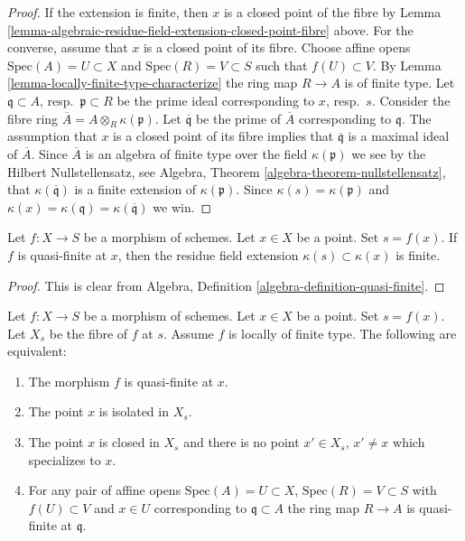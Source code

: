 \begin{proof}
If the extension is finite, then $x$ is a closed point of
the fibre by
Lemma \ref{lemma-algebraic-residue-field-extension-closed-point-fibre}
above. For the converse, assume that $x$ is a closed point
of its fibre. Choose affine opens $\text{Spec}(A) = U \subset X$
and $\text{Spec}(R) = V \subset S$ such that $f(U) \subset V$.
By Lemma \ref{lemma-locally-finite-type-characterize} the ring map
$R \to A$ is of finite type. Let $\mathfrak q \subset A$,
resp.\ $\mathfrak p \subset R$ be the prime ideal corresponding
to $x$, resp.\ $s$. Consider the fibre ring
$\overline{A} = A \otimes_R \kappa(\mathfrak p)$.
Let $\overline{\mathfrak q}$ be the prime of $\overline{A}$
corresponding to $\mathfrak q$. The assumption that $x$
is a closed point of its fibre implies that $\overline{\mathfrak q}$
is a maximal ideal of $\overline{A}$. Since $\overline{A}$
is an algebra of finite type over the field $\kappa(\mathfrak p)$
we see by the Hilbert Nullstellensatz, see
Algebra, Theorem \ref{algebra-theorem-nullstellensatz},
that $\kappa(\overline{\mathfrak q})$ is a finite extension
of $\kappa(\mathfrak p)$.
Since $\kappa(s) = \kappa(\mathfrak p)$ and
$\kappa(x) = \kappa(\mathfrak q) = \kappa(\overline{\mathfrak q})$
we win.
\end{proof}

\begin{lemma}
\label{lemma-residue-field-quasi-finite}
Let $f : X \to S$ be a morphism of schemes.
Let $x \in X$ be a point. Set $s = f(x)$.
If $f$ is quasi-finite at $x$, then the residue field
extension $\kappa(s) \subset \kappa(x)$ is finite.
\end{lemma}

\begin{proof}
This is clear from Algebra, Definition \ref{algebra-definition-quasi-finite}.
\end{proof}

\begin{lemma}
\label{lemma-quasi-finite-at-point-characterize}
Let $f : X \to S$ be a morphism of schemes.
Let $x \in X$ be a point. Set $s = f(x)$.
Let $X_s$ be the fibre of $f$ at $s$.
Assume $f$ is locally of finite type.
The following are equivalent:
\begin{enumerate}
\item The morphism $f$ is quasi-finite at $x$.
\item The point $x$ is isolated in $X_s$.
\item The point $x$ is closed in $X_s$
and there is no point $x' \in X_s$, $x' \not = x$
which specializes to $x$.
\item For any pair of affine opens
$\text{Spec}(A) = U \subset X$, $\text{Spec}(R) = V \subset S$ with
$f(U) \subset V$ and $x \in U$ corresponding to $\mathfrak q \subset A$
the ring map $R \to A$ is quasi-finite at $\mathfrak q$.
\end{enumerate}
\end{lemma}


